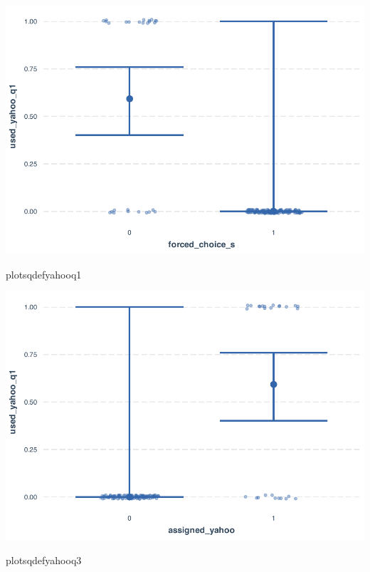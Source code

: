 \documentclass[
  11pt,
]{article}
\newenvironment{Shaded}{\begin{snugshade}}{\end{snugshade}}
\newcommand{\NormalTok}[1]{#1}
\begin{document}
\includegraphics{analysis-July19_files/figure-latex/unnamed-chunk-21-1.pdf}

\begin{Shaded}
\begin{Highlighting}[]
\NormalTok{plotsqdefyahooq1}
\end{Highlighting}
\end{Shaded}

\includegraphics{analysis-July19_files/figure-latex/unnamed-chunk-21-2.pdf}

\begin{Shaded}
\begin{Highlighting}[]
\NormalTok{plotsqdefyahooq3}
\end{Highlighting}
\end{Shaded}
\end{document}
